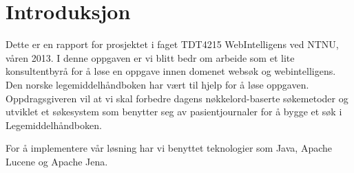 \section{Introduksjon}
\label{sec:introduction}

Dette er en rapport for prosjektet i faget TDT4215 WebIntelligens ved NTNU, våren 2013. I denne oppgaven er vi blitt bedr om arbeide som et lite konsultentbyrå for å løse en oppgave innen domenet websøk og webintelligens. Den norske legemiddelhåndboken har vært til hjelp for å løse oppgaven. Oppdragsgiveren vil at vi skal forbedre dagens nøkkelord-baserte søkemetoder og utviklet et søkesystem som benytter seg av pasientjournaler for å bygge et søk i Legemiddelhåndboken.

For å implementere vår løsning har vi benyttet teknologier som Java, Apache Lucene og Apache Jena.